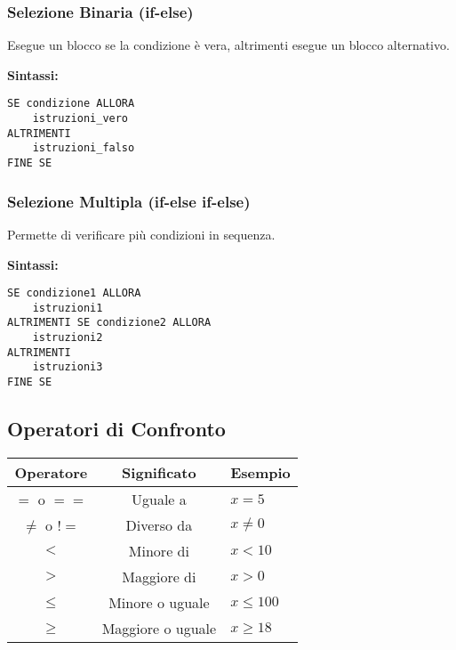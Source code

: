 \documentclass[a4paper,16pt]{article}
\begin{document}
\newpage
\subsubsection{Selezione Binaria (if-else)}

Esegue un blocco se la condizione è vera, altrimenti esegue un blocco alternativo.

\textbf{Sintassi:}
\begin{lstlisting}
SE condizione ALLORA
    istruzioni_vero
ALTRIMENTI
    istruzioni_falso
FINE SE
\end{lstlisting}

\begin{center}
\end{center}

\subsubsection{Selezione Multipla (if-else if-else)}

Permette di verificare più condizioni in sequenza.

\textbf{Sintassi:}
\begin{lstlisting}
SE condizione1 ALLORA
    istruzioni1
ALTRIMENTI SE condizione2 ALLORA
    istruzioni2
ALTRIMENTI
    istruzioni3
FINE SE
\end{lstlisting}

\subsection{Operatori di Confronto}

\begin{center}
\begin{tabular}{|c|c|l|}
\hline
\textbf{Operatore} & \textbf{Significato} & \textbf{Esempio} \\
\hline
$=$ o $==$ & Uguale a & $x = 5$ \\
$\neq$ o $!=$ & Diverso da & $x \neq 0$ \\
$<$ & Minore di & $x < 10$ \\
$>$ & Maggiore di & $x > 0$ \\
$\leq$ & Minore o uguale & $x \leq 100$ \\
$\geq$ & Maggiore o uguale & $x \geq 18$ \\
\hline
\end{tabular}
\end{center}
\end{document}
